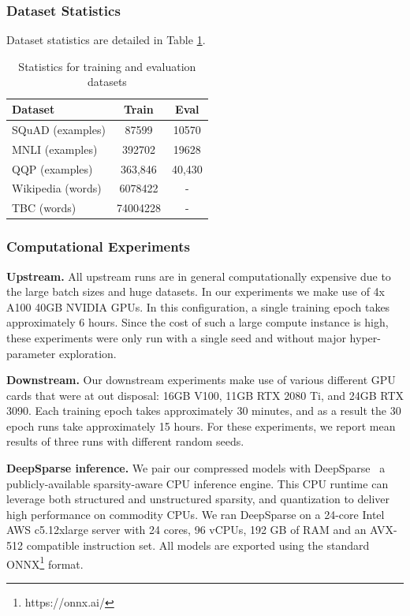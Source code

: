 \documentclass[11pt]{article}
\begin{document}
\subsubsection{Dataset Statistics}
Dataset statistics are detailed in Table \ref{tab:dataset_stat}.
\begin{table}[!htb]
      \centering
         {\small 
             \begin{tabular}{l|c|c}
                \toprule 
                Dataset & Train & Eval \\
                \midrule
                SQuAD (examples) &  87599 & 10570\\
                \midrule
                MNLI (examples) & 392702 & 19628 \\
                \midrule
                QQP (examples) &  363,846 & 40,430 \\
                \midrule
                Wikipedia (words) & 6078422  & - \\
                \midrule
                TBC (words) & 74004228 & - \\ 
                \bottomrule
            \end{tabular}
         }
     \caption{Statistics for training and evaluation datasets}
    \label{tab:dataset_stat}
\end{table}

\subsubsection{Computational Experiments}
\noindent\textbf{Upstream.} All upstream runs are in general computationally expensive due to the large batch sizes and huge datasets. In our experiments we make use of 4x A100 40GB NVIDIA GPUs. In this configuration, a single training epoch takes approximately 6 hours. Since the cost of such a large compute instance is high, these experiments were only run with a single seed and without major hyper-parameter exploration.

\noindent\textbf{Downstream.} Our downstream experiments make use of various different GPU cards that were at out disposal: 16GB V100, 11GB RTX 2080 Ti, and 24GB RTX 3090. Each training epoch takes approximately 30 minutes, and as a result the 30 epoch runs take approximately 15 hours. For these experiments, we report mean results of three runs with different random seeds.

\noindent\textbf{DeepSparse inference.} We pair our compressed models with DeepSparse~\cite{deepsparse} a publicly-available sparsity-aware CPU inference engine. This CPU runtime can leverage both structured and unstructured sparsity, and quantization to deliver high performance on commodity CPUs. We ran DeepSparse on a 24-core Intel AWS c5.12xlarge server with 24 cores, 96 vCPUs, 192 GB of RAM and an AVX-512 compatible instruction set. All models are exported using the standard ONNX\footnote{https://onnx.ai/} format.
\end{document}
